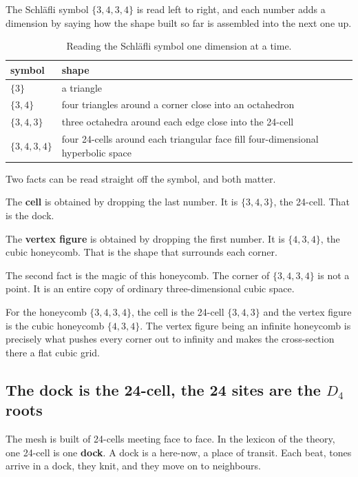 The Schläfli symbol $\{3,4,3,4\}$ is read left to right, and each number adds a dimension by saying how the shape built so far is assembled into the next one up.

\begin{table}[ht]
\centering
\begin{tabular}{@{}ll@{}}
\toprule
symbol & shape \\
\midrule
$\{3\}$ & a triangle \\
$\{3,4\}$ & four triangles around a corner close into an octahedron \\
$\{3,4,3\}$ & three octahedra around each edge close into the 24-cell \\
$\{3,4,3,4\}$ & four 24-cells around each triangular face fill four-dimensional hyperbolic space \\
\bottomrule
\end{tabular}
\caption{Reading the Schläfli symbol one dimension at a time.}
\label{tab:schlafli-ladder}
\end{table}

Two facts can be read straight off the symbol, and both matter.

The \textbf{cell} is obtained by dropping the last number. It is $\{3,4,3\}$, the 24-cell. That is the dock.

The \textbf{vertex figure} is obtained by dropping the first number. It is $\{4,3,4\}$, the cubic honeycomb. That is the shape that surrounds each corner.

The second fact is the magic of this honeycomb. The corner of $\{3,4,3,4\}$ is not a point. It is an entire copy of ordinary three-dimensional cubic space.

\begin{proposition}
For the honeycomb $\{3,4,3,4\}$, the cell is the 24-cell $\{3,4,3\}$ and the vertex figure is the cubic honeycomb $\{4,3,4\}$. The vertex figure being an infinite honeycomb is precisely what pushes every corner out to infinity and makes the cross-section there a flat cubic grid.
\end{proposition}

\subsection{The dock is the 24-cell, the 24 sites are the $D_4$ roots}

The mesh is built of 24-cells meeting face to face. In the lexicon of the theory, one 24-cell is one \textbf{dock}. A dock is a here-now, a place of transit. Each beat, tones arrive in a dock, they knit, and they move on to neighbours.

